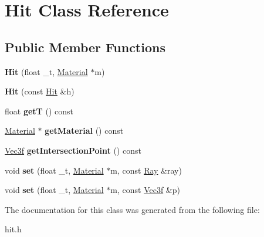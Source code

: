 \hypertarget{classHit}{\section{\-Hit \-Class \-Reference}
\label{classHit}
}
\subsection*{\-Public \-Member \-Functions}
\begin{DoxyCompactItemize}
\item 
\hypertarget{classHit_af4e8a3baf5584547acc24a5b8ec156d0}{{\bfseries \-Hit} (float \-\_\-t, \hyperlink{classMaterial}{\-Material} $\ast$m)}\label{classHit_af4e8a3baf5584547acc24a5b8ec156d0}

\item 
\hypertarget{classHit_acb4d552eb2451c8310329e485a516d06}{{\bfseries \-Hit} (const \hyperlink{classHit}{\-Hit} \&h)}\label{classHit_acb4d552eb2451c8310329e485a516d06}

\item 
\hypertarget{classHit_af5ebbf2d4370f17826617ea7d441abd9}{float {\bfseries get\-T} () const }\label{classHit_af5ebbf2d4370f17826617ea7d441abd9}

\item 
\hypertarget{classHit_a8143afec295fb4418daf38d207692923}{\hyperlink{classMaterial}{\-Material} $\ast$ {\bfseries get\-Material} () const }\label{classHit_a8143afec295fb4418daf38d207692923}

\item 
\hypertarget{classHit_ac07b2cc6a362e066abc87b86ff4c281d}{\hyperlink{classVec3f}{\-Vec3f} {\bfseries get\-Intersection\-Point} () const }\label{classHit_ac07b2cc6a362e066abc87b86ff4c281d}

\item 
\hypertarget{classHit_a1c98ee7686a615d6382ffbdd8e62e818}{void {\bfseries set} (float \-\_\-t, \hyperlink{classMaterial}{\-Material} $\ast$m, const \hyperlink{classRay}{\-Ray} \&ray)}\label{classHit_a1c98ee7686a615d6382ffbdd8e62e818}

\item 
\hypertarget{classHit_a186c224bfec1de80cd05bde40710da54}{void {\bfseries set} (float \-\_\-t, \hyperlink{classMaterial}{\-Material} $\ast$m, const \hyperlink{classVec3f}{\-Vec3f} \&p)}\label{classHit_a186c224bfec1de80cd05bde40710da54}

\end{DoxyCompactItemize}


\-The documentation for this class was generated from the following file\-:\begin{DoxyCompactItemize}
\item 
hit.\-h\end{DoxyCompactItemize}
